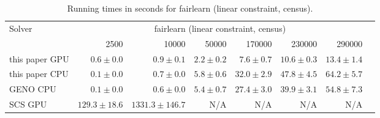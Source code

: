 
\begin{table}[h!]
\begin{center}
\small
  \begin{tabular}{l*{7}{r}}
    \toprule
    \multirow{2}{*}{Solver} & \multicolumn{6}{c}{fairlearn (linear constraint, census)} \\
    \cmidrule{2-7}
					& 2500            & 10000             & 50000         & 170000        & 230000        & 290000 \\
    \midrule                                                                                              
    this paper GPU 	& $0.6\pm 0.0$    & $0.9\pm 0.1$      & $2.2\pm 0.2$  & $7.6\pm 0.7$  & $10.6\pm 0.3$ & $13.4\pm 1.4$ \\
    this paper CPU 	& $0.1\pm 0.0$    & $0.7\pm 0.0$      & $5.8\pm 0.6$  & $32.0\pm 2.9$ & $47.8\pm 4.5$ & $64.2\pm 5.7$ \\
    GENO CPU       	& $0.1\pm 0.0$ 	  & $0.6\pm 0.0$      & $5.4\pm 0.7$  & $27.4\pm 3.0$ & $39.9\pm 3.1$ & $54.8\pm 7.3$ \\
    SCS GPU        	& $129.3\pm 18.6$ & $1331.3\pm 146.7$ & N/A & N/A & N/A & N/A  \\
    \bottomrule
  \end{tabular}%
  \caption{Running times in seconds for fairlearn (linear constraint, census).}
  \end{center}
\end{table}
